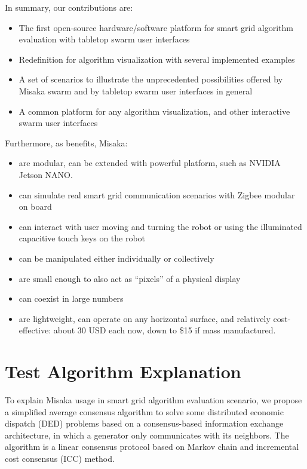 \documentclass[conference]{IEEEtran}
\begin{document}
In summary, our contributions are:

\begin{itemize}
    \item The first open-source hardware/software platform for smart grid algorithm evaluation with tabletop swarm user interfaces
    \item Redefinition for algorithm visualization with several implemented examples
    \item A set of scenarios to illustrate the unprecedented possibilities offered by Misaka swarm and by tabletop swarm user interfaces in general
    \item A common platform for any algorithm visualization, and other interactive swarm user interfaces
\end{itemize}

Furthermore, as benefits, Misaka:

\begin{itemize}
    \item are modular, can be extended with powerful platform, such as NVIDIA Jetson NANO.
    \item can simulate real smart grid communication scenarios with Zigbee modular on board
    \item can interact with user moving and turning the robot or using the illuminated capacitive touch keys on the robot 
    \item can be manipulated either individually or collectively
    \item are small enough to also act as “pixels” of a physical display
    \item can coexist in large numbers
    \item are lightweight, can operate on any horizontal surface, and relatively cost-effective: about 30 USD each now, down to \$15 if mass manufactured.
\end{itemize}

\section{Test Algorithm Explanation}
\label{sec:Algorithm}

To explain Misaka usage in smart grid algorithm evaluation scenario, we propose a simplified average consensus algorithm to solve some distributed economic dispatch (DED) problems based on a consensus-based information exchange architecture, in which a generator only communicates with its neighbors. The algorithm is a linear consensus protocol based on Markov chain and incremental cost consensus (ICC) method.
\end{document}
